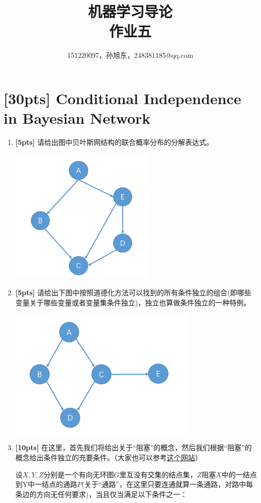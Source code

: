 \documentclass[a4paper,UTF8]{article}
\numberwithin{equation}{section}
\begin{document}
\title{机器学习导论\\
作业五}
\author{151220097，孙旭东，248381185@qq.com}
\maketitle
\section{[30pts] Conditional Independence in Bayesian Network}
\begin{enumerate}[(1)]
	\item \textbf{[5pts]} 请给出图中贝叶斯网结构的联合概率分布的分解表达式。
	
	\label{structure1}
	\includegraphics[width=7cm]{structure1.png}
	\item \textbf{[5pts]} 请给出下图中按照道德化方法可以找到的所有条件独立的组合(即哪些变量关于哪些变量或者变量集条件独立)，独立也算做条件独立的一种特例。
	
	\includegraphics[width=9cm]{structure2.png}
	
	
	\item \textbf{[10pts]} 在这里，首先我们将给出关于“阻塞”的概念，然后我们根据“阻塞”的概念给出条件独立的充要条件。（大家也可以参考\href{http://www.andrew.cmu.edu/user/scheines/tutor/d-sep.html#formaldef}{这个网站}）
	\begin{def-box}[阻塞]
		设$X,Y,Z$分别是一个有向无环图$G$里互没有交集的结点集，$Z$阻塞$X$中的一结点到Y中一结点的通路$P$(关于“通路”，在这里只要连通就算一条通路，对路中每条边的方向无任何要求)，当且仅当满足以下条件之一：
		

\end{def-box}
\end{enumerate}
\end{document}
